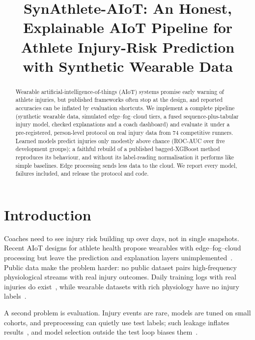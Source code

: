 \documentclass[conference]{IEEEtran}
\begin{document}
\title{SynAthlete-AIoT: An Honest, Explainable AIoT Pipeline for Athlete Injury-Risk Prediction
with Synthetic Wearable Data}
\author{
}
\maketitle

\begin{abstract}
Wearable artificial-intelligence-of-things (AIoT) systems promise early warning of athlete
injuries, but published frameworks often stop at the design, and reported accuracies can be
inflated by evaluation shortcuts. We implement a complete pipeline (synthetic wearable data,
simulated edge--fog--cloud tiers, a fused sequence-plus-tabular injury model, checked
explanations and a coach dashboard) and evaluate it under a pre-registered, person-level
protocol on real injury data from 74 competitive runners. Learned models predict injuries only
modestly above chance (ROC-AUC \injuryAucRange{} over five development groups); a faithful
rebuild of a published bagged-XGBoost method reproduces its behaviour, and without its
label-reading normalisation it performs like simple baselines. Edge processing sends
\tiersReduction{} less data to the cloud. We report every model, failures included, and release
the protocol and code.
\end{abstract}

\section{Introduction}
Coaches need to see injury risk building up over days, not in single snapshots. Recent AIoT
designs for athlete health propose wearables with edge--fog--cloud processing but leave the
prediction and explanation layers unimplemented~\cite{aiotframework2026}. Public data make the
problem harder: no public dataset pairs high-frequency physiological streams with real injury
outcomes. Daily training logs with real injuries do exist~\cite{lovdal2021,lovdal2021data},
while wearable datasets with rich physiology have no injury labels~\cite{reiss2012,schmidt2018}.

A second problem is evaluation. Injury events are rare, models are tuned on small cohorts, and
preprocessing can quietly use test labels; such leakage inflates results~\cite{kapoor2023}, and
model selection outside the test loop biases them~\cite{varma2006,cawley2010}.
\end{document}
